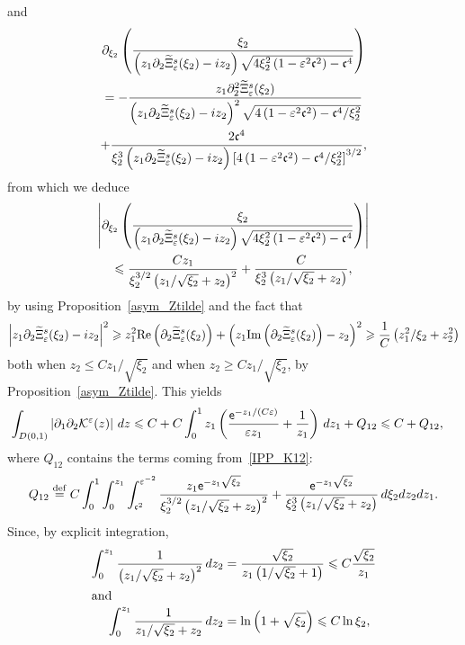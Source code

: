 \documentclass[10pt]{amsart}
\theoremstyle{definition}\newtheorem{defi}[theo]{Definition}\newtheorem{rema}[theo]{Remark}\newtheorem{exam}[theo]{Example}\newtheorem{exem}[theo]{Example}\newtheorem{nota}[theo]{Notation}
\newcommand*\p{\partial}
\newcommand*\ddef{\stackrel{\rm def}{=}}
\newcommand{\Imm}{\mathrm{Im}}
\newcommand{\Rel}{\mathrm{Re}}
\newcommand*\BK{\mathcal{K}}
\newcommand*\ex{{\sf e}}
\newcommand*\cs{{\mathfrak c}}
\newcommand*\gs{\geqslant }
\newcommand*\ls{\leqslant }
\newcommand*\e{\varepsilon}
\renewcommand*\t{\tilde}
\let\oldtilde\tilde
\renewcommand*{\tilde}[1]{\mathchoice{\widetilde{#1}}{\widetilde{#1}}{\oldtilde{#1}}{\oldtilde{#1}}}
\begin{document}
and
\begin{multline}\label{IPP_K12}
\p_{\xi_2}  \left(\frac{ \xi_2 }{\left(z_1 \p_2 \t\Xi_\e^s (\xi_2) - i z_2\right) \sqrt{ 4 \xi_2^2 \left(1 - \e^2 \cs^2\right) - \cs^4 } } \right)
\\
= - \frac{ z_1 \p_2^2 \t\Xi_\e^s (\xi_2) }{\left(z_1 \p_2 \t\Xi_\e^s (\xi_2) - i z_2\right)^2 \sqrt{ 4\left(1 - \e^2 \cs^2\right) - \cs^4 /\xi_2^2} }
\\ 
+ \frac{ 2 \cs^4 }{ \xi_2^3 \left(z_1 \p_2 \t\Xi_\e^s (\xi_2) - i z_2\right) \left[4 \left(1 - \e^2 \cs^2\right) - \cs^4 /\xi_2^2\right]^{3/2} },
\end{multline}
from which we deduce
\begin{multline*}
\left\lvert \p_{\xi_2} \left(\frac{ \xi_2 }{ \left(z_1 \p_2 \t\Xi_\e^s (\xi_2) - i z_2\right) \sqrt{ 4 \xi_2^2 \left(1 - \e^2 \cs^2\right) - \cs^4 } } \right) \right\lvert
\\ 
\ls \frac{ C z_1 }{ \xi_2^{3/2 } \left(z_1 / \sqrt{\xi_2 } + z_2\right)^2 } + \frac{ C }{ \xi_2^3 \left(z_1 / \sqrt{\xi_2 } + z_2\right) },
\end{multline*}
by using Proposition~\ref{asym_Ztilde} and the fact that
\[
\left\lvert z_1 \p_2 \t\Xi_\e^s (\xi_2) - i z_2 \right\rvert^2
\gs z_1^2 \Rel \left(\p_2 \t\Xi_\e^s (\xi_2)\right) + \left(z_1 {\Imm} \left(\p_2 \t\Xi_\e^s (\xi_2)\right) - z_2 \right)^2
\gs
\frac{1}{C} \left(z_1^2 / \xi_2 + z_2^2\right)
\]
both when $ z_2 \ls C z_1 / \sqrt{\xi_2 } $ and when $ z_2 \gs C z_1 / \sqrt{\xi_2 } $, by Proposition~\ref{asym_Ztilde}. This yields
\begin{align*}
\int_{D(0,1)} \left\lvert \p_1 \p_2 \BK^\e (z) \right\rvert \, dz & \ls C + C \int_0^1 z_1 \left(\frac{ \ex^{- z_1/(C \e) } }{ \e z_1 } + \frac{1}{z_1} \right) \, d z_1 + Q_{12}
\ls C + Q_{12},
\end{align*}
where $ Q_{12} $ contains the terms coming from~\eqref{IPP_K12}:
\begin{align*}
Q_{12} \ddef C \int_{0}^1 \int_{0}^{z_1} \int_{\cs^2}^{\e^{-2}} \frac{ z_1 \ex^{ - z_1 \sqrt{\xi_2 } } }{ \xi_2^{3/2 } \left(z_1 / \sqrt{\xi_2 } + z_2\right)^2 } + \frac{ \ex^{ - z_1 \sqrt{\xi_2 } } }{ \xi_2^3 \left(z_1 / \sqrt{\xi_2 } + z_2\right) } \, d\xi_2 dz_2dz_1.
\end{align*}
Since, by explicit integration,
\begin{align*}
\int_{0}^{z_1}  \frac{ 1 }{\left(z_1 / \sqrt{\xi_2 } + z_2\right)^2 } \, dz_2 &= \frac{ \sqrt{\xi_2 } }{ z_1 \left(1 / \sqrt{\xi_2 } + 1\right) }
\ls C \frac{ \sqrt{\xi_2 } }{ z_1 }
\\
\intertext{and}
\int_{0}^{z_1} \frac{1 }{ z_1 / \sqrt{\xi_2 } + z_2 } \, dz_2 &= \ln \left(1 + \sqrt{\xi_2 }\right)
\ls C \ln \xi_2,
\end{align*}
\end{document}
